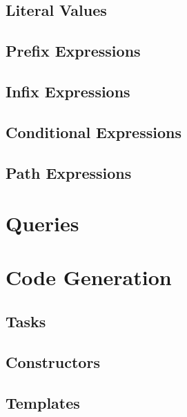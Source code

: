 \documentclass[a4paper,oneside,12pt, extrafontsizes]{memoir}
\theoremstyle{definition}
\theoremstyle{definition}
\theoremstyle{definition}
\theoremstyle{definition}
\theoremstyle{definition}
\begin{document}
\section{Literal Values}
\label{sec:literals}


\section{Prefix Expressions}
\label{sec:prefix}


\section{Infix Expressions}
\label{sec:infix}


\section{Conditional Expressions}
\label{sec:conditionals}


\section{Path Expressions}
\label{sec:paths}


\chapter{Queries}
\label{ch:queries}


\chapter{Code Generation}
\label{ch:codegen}

\section{Tasks}
\label{sec:tasks}

\section{Constructors}
\label{sec:constructors}

\section{Templates}
\label{sec:templates}
\end{document}
